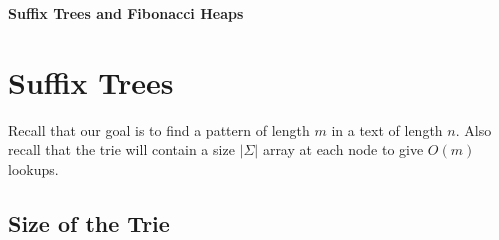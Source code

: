 \documentclass{article}
\begin{document}
%


%
%
%
%

%




\begin{center}
{\large \bf Suffix Trees and Fibonacci Heaps}
\end{center}

\section{Suffix Trees}

Recall that our goal is to find a pattern of length $m$ in a text of
length $n$.  Also recall that the trie will contain a size $|\Sigma|$
array at each node to give $O(m)$ lookups.

\subsection{Size of the Trie}
\end{document}
